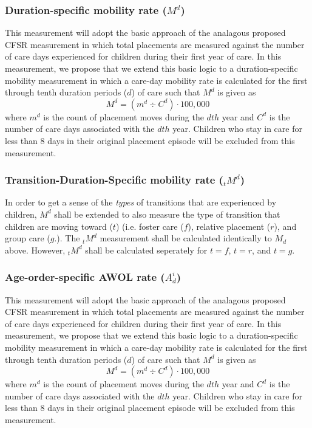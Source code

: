 \documentclass[12pt]{article}\usepackage[]{graphicx}\usepackage[]{color}
\begin{document}
\subsubsection{Duration-specific mobility rate ($M^d$)}
This measurement will adopt the basic approach of the analagous proposed CFSR measurement in which total placements are measured against the number of care days experienced for children during their first year of care. In this measurement, we propose that we extend this basic logic to a duration-specific mobility measurement in which a care-day mobility rate is calculated for the first through tenth duration periods ($d$) of care such that $M^d$ is given as 
\begin{equation}\label{eq:M_d}
M^d = (m^d \div C^d) \cdot 100,000
\end{equation}
where $m^d$ is the count of placement moves during the $dth$ year and $C^d$ is the number of care days associated with the $dth$ year. Children who stay in care for less than 8 days in their original placement episode will be excluded from this measurement.

\subsubsection{Transition-Duration-Specific mobility rate (${}_tM^d$)}
In order to get a sense of the \emph{types} of transitions that are experienced by children, $M^d$ shall be extended to also measure the type of transition that children are moving toward ($t$) (i.e. foster care ($f$), relative placement ($r$), and group care ($g$.). The ${}_tM^d$ measurement shall be calculated identically to $M_d$ above. However, ${}_tM^d$ shall be calculated seperately for $t=f$, $t=r$, and $t=g$. 

\subsubsection{Age-order-specific AWOL rate ($A^i_d$)}
This measurement will adopt the basic approach of the analagous proposed CFSR measurement in which total placements are measured against the number of care days experienced for children during their first year of care. In this measurement, we propose that we extend this basic logic to a duration-specific mobility measurement in which a care-day mobility rate is calculated for the first through tenth duration periods ($d$) of care such that $M^d$ is given as 
\begin{equation}\label{eq:M_d}
M^d = (m^d \div C^d) \cdot 100,000
\end{equation}
where $m^d$ is the count of placement moves during the $dth$ year and $C^d$ is the number of care days associated with the $dth$ year. Children who stay in care for less than 8 days in their original placement episode will be excluded from this measurement.
\end{document}
